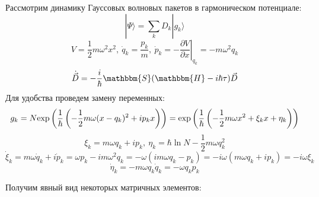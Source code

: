 Рассмотрим динамику Гауссовых волновых пакетов в гармоническом потенциале:
$$|\Psi\rangle = \sum_k D_k|g_k\rangle$$
$$V = \frac{1}{2}m\omega^2x^2,\ \dot{q}_k=\frac{p_k}{m},\ \dot{p}_k=-\left.\frac{\partial V}{\partial x}\right|_{q_k}=-m\omega^2q_k $$
$$\dot{\vec{D}} = -\frac{i}{\hbar}\mathbbm{S}(\mathbbm{H}-i\hbar\tau)\vec{D}$$
Для удобства проведем замену переменных:
$$g_k=N\myexp{\frac{1}{\hbar}\left(-\frac{1}{2}m\omega(x-q_k)^2+ip_kx\right)}=%
       \myexp{\frac{1}{\hbar}\left(-\frac{1}{2}m\omega x^2 + \xi_kx + \eta_k\right)}$$
$$\xi_k=m\omega q_k+ip_k,\ \eta_k=\hbar\ln N-\frac{1}{2}m\omega q_k^2$$
$$\dot{\xi}_k=m\omega\dot{q}_k+i\dot{p}_k=\omega p_k-im\omega^2q_k=-\omega(im\omega q_k - p_k)=-i\omega(m\omega q_k+ip_k)=-i\omega\xi_k$$
$$\dot{\eta}_k=-m\omega q_k\dot{q}_k=-\omega q_kp_k$$

Получим явный вид некоторых матричных элементов:
